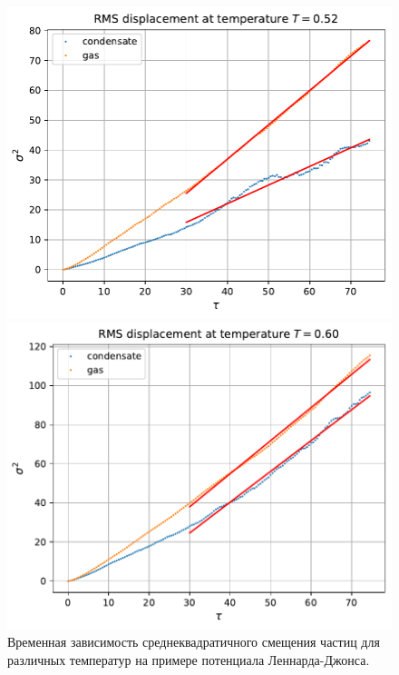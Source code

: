 \documentclass[pdf,hyperref={unicode}]{beamer}
\begin{document}
\begin{frame}
\begin{columns}
\begin{column}{0.6\linewidth}
\begin{figure}[h]
\begin{center}
\begin{minipage}[h]{0.45\linewidth}
\includegraphics[width=\textwidth, keepaspectratio]{diffusion_fit_0.52}
\end{minipage}
\begin{minipage}[h]{0.45\linewidth}
\includegraphics[width=\textwidth, keepaspectratio]{diffusion_fit_0.60}
\end{minipage}
\caption{\tiny Временная зависимость среднеквадратичного смещения частиц для различных температур на примере потенциала Леннарда-Джонса.}
\label{risRMS}
\end{center}
\end{figure}


\end{column}
\end{columns}
\end{frame}
\end{document}
